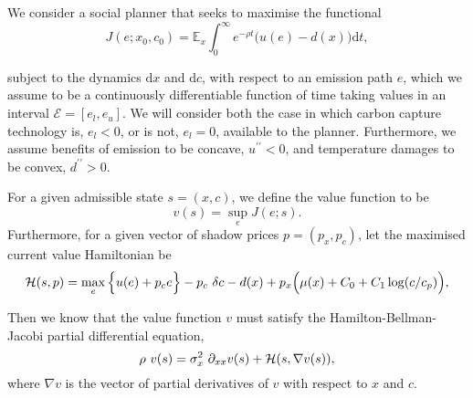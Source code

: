 \documentclass[../../main.tex]{subfiles}
\begin{document}
We consider a social planner that seeks to maximise the functional \begin{equation}
    J(e; x_0, c_0) = \mathbb{E}_{x} \int^{\infty}_0 e^{-\rho t} \Big(u(e) - d(x)\Big) \text{d} t,
\end{equation}

subject to the dynamics $\text{d}x$ and $\text{d}c$, with respect to an emission path $e$, which we assume to be a continuously differentiable function of time taking values in an interval $\mathcal{E} = [e_l, e_u]$. We will consider both the case in which carbon capture technology is, $e_l < 0$, or is not, $e_l = 0$, available to the planner. Furthermore, we assume benefits of emission to be concave, $u^{\prime \prime} < 0$, and temperature damages to be convex, $d^{\prime \prime} > 0$.

For a given admissible state $s = (x, c)$, we define the value function to be \begin{equation}
    v(s) = \sup_{e} J(e; s).
\end{equation} Furthermore, for a given vector of shadow prices $p = (p_x, p_c)$, let the maximised current value Hamiltonian be \begin{equation}
    \mathcal{H}(s, p) = \max_e \Big\{u(e) + p_c e \Big\} - p_c \ \delta c - d(x) + p_x \Big(\mu(x) + C_0 + C_1 \log(c / c_p)\Big),
\end{equation} 

Then we know that the value function $v$ must satisfy the Hamilton-Bellman-Jacobi partial differential equation, \begin{equation} \label{eq:hbj}
    \rho \ v(s) = \sigma^2_x \ \partial_{x x} v(s) + \mathcal{H}(s, \nabla v(s)),
\end{equation} where $\nabla v$ is the vector of partial derivatives of $v$ with respect to $x$ and $c$.
\end{document}
